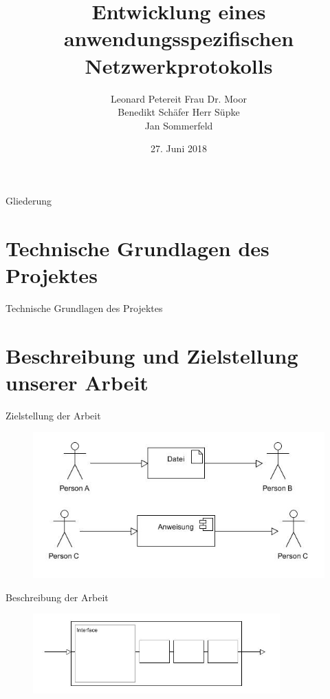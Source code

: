\documentclass{beamer}
\title[]{Entwicklung eines anwendungsspezifischen Netzwerkprotokolls}
\author{Leonard Petereit\hfill \hspace{0.5cm} Frau Dr. Moor\\ Benedikt Schäfer\hfill \hspace{1cm} Herr Süpke \\ Jan Sommerfeld \hspace{4.25cm} }
\institute{Albert-Schweitzer Gymnasium Erfurt - Spezialschulteil}
\date{27. Juni 2018}
\begin{document}
\begin{frame}
	
  \titlepage
\end{frame}

\begin{frame}{Gliederung}

  \tableofcontents
\end{frame}



\section{Technische Grundlagen des Projektes}

\begin{frame}{Technische Grundlagen des Projektes}

\end{frame}

\section{Beschreibung und Zielstellung unserer Arbeit}

\begin{frame}{Zielstellung der Arbeit}
\begin{figure}
\includegraphics[width=\textwidth]{anw.jpg}
\end{figure}
\end{frame}

\begin{frame}{Beschreibung der Arbeit}
\begin{figure}
\includegraphics[width=9.5cm]{int.jpg}
\end{figure}
\end{frame}
\end{document}
